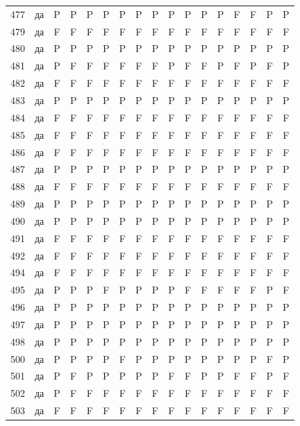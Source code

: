 \begin{table}[p]
\begin{tabular*}{\textwidth}{@{\extracolsep{\fill}}rcccccccccccccccc}
477 & да & P & P & P & P & P & P & P & P & P & P & P & F & F & P & P\\
479 & да & F & F & F & F & F & F & F & F & F & F & F & F & F & F & F\\
480 & да & P & P & P & P & P & P & P & P & P & P & P & P & P & P & P\\
481 & да & P & F & F & F & F & F & F & P & F & F & P & F & P & F & P\\
482 & да & F & F & F & F & F & F & F & F & F & F & F & F & F & F & F\\
483 & да & P & P & P & P & P & P & P & P & P & P & P & P & P & P & P\\
484 & да & F & F & F & F & F & F & F & F & F & F & F & F & F & F & F\\
485 & да & F & F & F & F & F & F & F & F & F & F & F & F & F & F & F\\
486 & да & F & F & F & F & F & F & F & F & F & F & F & F & F & F & F\\
487 & да & P & P & P & P & P & P & P & P & P & P & P & P & P & P & P\\
488 & да & F & F & F & F & F & F & F & F & F & F & F & F & F & F & F\\
489 & да & P & P & P & P & P & P & P & P & P & P & P & P & P & P & P\\
490 & да & P & P & P & P & P & P & P & P & P & P & P & P & P & P & P\\
491 & да & F & F & F & F & F & F & F & F & F & F & F & F & F & F & F\\
492 & да & F & F & F & F & F & F & F & F & F & F & F & F & F & F & F\\
494 & да & F & F & F & F & F & F & F & F & F & F & F & F & F & F & F\\
495 & да & P & P & P & F & P & P & P & P & F & F & F & F & F & P & F\\
496 & да & P & P & P & P & P & P & P & P & P & P & P & P & P & P & P\\
497 & да & P & P & P & P & P & P & P & P & P & P & P & P & P & P & P\\
498 & да & P & P & P & P & P & P & P & P & P & P & P & P & P & P & P\\
500 & да & P & P & P & P & F & P & P & P & P & P & P & P & P & F & P\\
501 & да & P & F & P & P & P & P & P & F & F & P & P & F & F & P & F\\
502 & да & P & F & F & F & F & F & F & F & F & F & F & F & F & F & F\\
503 & да & F & F & F & F & F & F & F & F & F & F & F & F & F & F & F\\
\bottomrule\end{tabular*}\end{table}
\clearpage

